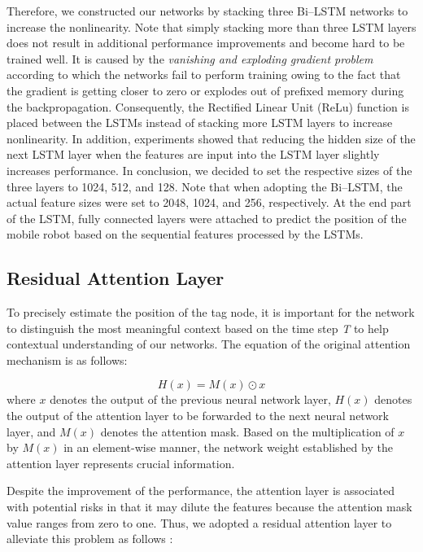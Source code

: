 \documentclass[letterpaper, 10 pt, conference]{ieeeconf}
\begin{document}
Therefore, we constructed our networks by stacking three Bi--LSTM networks to increase the nonlinearity. Note that simply stacking more than three LSTM layers does not result in additional performance improvements and become hard to be trained well. It is caused by the \textit{vanishing and exploding gradient problem} \cite{hochreiter2001gradient, pascanu2013difficulty,pascanu2012understanding} according to which the networks fail to perform training owing to the fact that the gradient is getting closer to zero or explodes out of prefixed memory during the backpropagation. Consequently, the Rectified Linear Unit (ReLu) function is placed between the LSTMs \cite{nair2010rectified} instead of stacking more LSTM layers to increase nonlinearity. In addition, experiments showed that reducing the hidden size of the next LSTM layer when the features are input into the LSTM layer slightly increases performance. In conclusion, we decided to set the respective sizes of the three layers to 1024, 512, and 128. Note that when adopting the Bi--LSTM, the actual feature sizes were set to 2048, 1024, and 256, respectively. At the end part of the LSTM, fully connected layers were attached to predict the position of the mobile robot based on the sequential features processed by the LSTMs.  

\subsection{Residual Attention Layer}

To precisely estimate the position of the tag node, it is important for the network to distinguish the most meaningful context based on the time step \textit{T} to help contextual understanding of our networks. The equation of the original attention mechanism is as follows:   

\begin{equation}
H(x)=M(x)\odot x
\end{equation} 
where $x$ denotes the output of the previous neural network layer, $H(x)$ denotes the output of the attention layer to be forwarded to the next neural network layer, and $M(x)$ denotes the attention mask. Based on the multiplication of $x$ by $M(x)$ in an element-wise manner, the network weight established by the attention layer represents crucial information. 

Despite the improvement of the performance, the attention layer is associated with potential risks in that it may dilute the features because the attention mask value ranges from zero to one. Thus, we adopted a residual attention layer to alleviate this problem as follows \cite{wang2017residual}:
\end{document}
